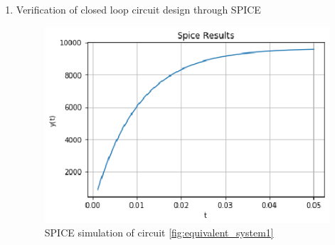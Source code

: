 \begin{enumerate}[label=\thesection.\arabic*.,ref=\thesection.\theenumi]
2) Designing $H(s) = H$

\begin{figure}[!hbt]
	\begin{center}
			\resizebox{\columnwidth}{!}{}
	\end{center}
\caption{Loop Gain}
\label{fig:equivalent_system4}
\end{figure}

\begin{align}
	V_{out} &= V_{in} \brak{\frac{R_{6}}{R_{5}+R_{6}}}
	\\
	{\frac{R_{6}}{R_{5}+R_{6}}} &= 0.002
	\\
	R_{6} &= 0.002 R_{5}
\end{align}

3) Closed loop design

\begin{figure}[!hbt]
	\begin{center}
			\resizebox{\columnwidth}{!}{}
	\end{center}
\caption{Closed Loop Circuit}
\label{closedloop}
\end{figure}

Figure \ref{closedloop} is the final closed loop design for transfer function $T(s)$

\begin{table}[!ht]
\centering

\caption{Circuit Parameters}
\label{table:DesignParams}
\end{table}

The table \ref{table:DesignParams} provides the parameters for our circuit design. 

The arbitrary parameters can be selected based on practical availability.


\item Verification of closed loop circuit design through SPICE


\begin{figure}[!ht]
\centering
    \includegraphics[width=\columnwidth]{./figs/Figure_4.eps}
  \caption{SPICE simulation of circuit \ref{fig:equivalent_system1}}
  \label{fig:SPICEresult}
\end{figure}


\end{enumerate}
